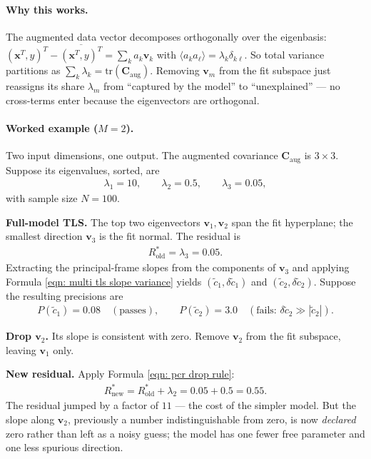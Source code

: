 \documentclass[twoside]{article}
\numberwithin{equation}{section}
\begin{document}
\paragraph{Why this works.}
The augmented data vector decomposes orthogonally over the eigenbasis: $(\mathbf{x}^T, y)^T - \overline{(\mathbf{x}^T, y)^T} = \sum_k a_k \mathbf{v}_k$ with $\langle a_k a_\ell \rangle = \lambda_k \delta_{k \ell}$. So total variance partitions as $\sum_k \lambda_k = \mathrm{tr}(\mathbf{C}_{\mathrm{aug}})$. Removing $\mathbf{v}_m$ from the fit subspace just reassigns its share $\lambda_m$ from ``captured by the model'' to ``unexplained'' --- no cross-terms enter because the eigenvectors are orthogonal.

\paragraph{Worked example ($M = 2$).}
Two input dimensions, one output. The augmented covariance $\mathbf{C}_{\mathrm{aug}}$ is $3 \times 3$. Suppose its eigenvalues, sorted, are
\begin{align*}
\lambda_1 = 10, \qquad \lambda_2 = 0.5, \qquad \lambda_3 = 0.05,
\end{align*}
with sample size $N = 100$.

\textbf{Full-model TLS.} The top two eigenvectors $\mathbf{v}_1, \mathbf{v}_2$ span the fit hyperplane; the smallest direction $\mathbf{v}_3$ is the fit normal. The residual is
\begin{align*}
R^*_{\mathrm{old}} = \lambda_3 = 0.05.
\end{align*}
Extracting the principal-frame slopes from the components of $\mathbf{v}_3$ and applying Formula \eqref{eqn: multi tls slope variance} yields $(\tilde{c}_1, \delta\tilde{c}_1)$ and $(\tilde{c}_2, \delta\tilde{c}_2)$. Suppose the resulting precisions are
\begin{align*}
P(\tilde{c}_1) = 0.08 \quad (\text{passes}),
\qquad
P(\tilde{c}_2) = 3.0 \quad (\text{fails: } \delta\tilde{c}_2 \gg |\tilde{c}_2|).
\end{align*}

\textbf{Drop $\mathbf{v}_2$.} Its slope is consistent with zero. Remove $\mathbf{v}_2$ from the fit subspace, leaving $\mathbf{v}_1$ only.

\textbf{New residual.} Apply Formula \eqref{eqn: pcr drop rule}:
\begin{align*}
R^*_{\mathrm{new}} = R^*_{\mathrm{old}} + \lambda_2 = 0.05 + 0.5 = 0.55.
\end{align*}
The residual jumped by a factor of $11$ --- the cost of the simpler model. But the slope along $\mathbf{v}_2$, previously a number indistinguishable from zero, is now \emph{declared} zero rather than left as a noisy guess; the model has one fewer free parameter and one less spurious direction.
\end{document}
